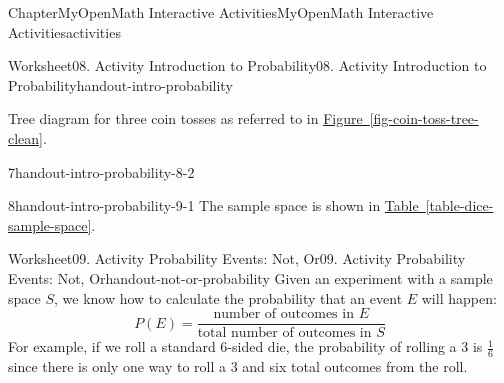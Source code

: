 \documentclass[oneside,10pt,]{book}
\newcommand{\blocktitlefont}{\relax}
\newcommand{\xreffont}{\relax}
\newcommand{\ptxlistdisc}{\raisebox{0.3ex}{\textbullet}}
\newlength{\fillinmaxwidth}
\newlength{\fillincontract}
\newlength{\charmaxwidth}\setlength{\charmaxwidth}{0.5em}
\newlength{\charminwidth}\setlength{\charminwidth}{0.1em}
\newlength{\fillinheight}
\newcommand{\fillintext}[1]{%
\setlength{\fillinmaxwidth}{#1\charmaxwidth}%
\setlength{\fillincontract}{#1\charminwidth}%
\setlength{\fillinheight}{\baselineskip}\addtolength{\fillinheight}{1.2pt}%
\strut\nobreak\leaders\vbox{\hrule width 0.3pt height 0.3pt \vskip -1.2pt}\hskip 1\fillinmaxwidth minus \fillincontract\nobreak\strut%
}
\begin{document}
\begin{chapterptx}{Chapter}{MyOpenMath Interactive Activities}{}{MyOpenMath Interactive Activities}{}{}{activities}
\begin{worksheet-section}{Worksheet}{08. Activity Introduction to Probability}{}{08. Activity Introduction to Probability}{}{}{handout-intro-probability}
%
\clearpage
Tree diagram for three coin tosses as referred to in \hyperref[fig-coin-toss-tree-clean]{Figure~{\xreffont\ref{fig-coin-toss-tree-clean}}}.%
\begin{divisionexercise}{7}{}{}{handout-intro-probability-8-2}%
\end{divisionexercise}%
\clearpage
\begin{divisionexercise}{8}{}{}{handout-intro-probability-9-1}%
The sample space is shown in \hyperref[table-dice-sample-space]{Table~{\xreffont\ref{table-dice-sample-space}}}.%
\end{divisionexercise}%
\end{worksheet-section}
\restoregeometry
%
%
\typeout{************************************************}
\typeout{************************************************}
%
\begin{worksheet-section}{Worksheet}{09. Activity Probability Events: Not, Or}{}{09. Activity Probability Events: Not, Or}{}{}{handout-not-or-probability}
Given an experiment with a sample space \(S\), we know how to calculate the probability that an event \(E\) will happen:%
\begin{equation*}
P(E) = \frac{\text{number of outcomes in } E}{\text{total number of outcomes in } S}
\end{equation*}
For example, if we roll a standard 6-sided die, the probability of rolling a 3 is \(\frac{1}{6}\) since there is only one way to roll a 3 and six total outcomes from the roll.%

\end{worksheet-section}
\end{chapterptx}
\end{document}
